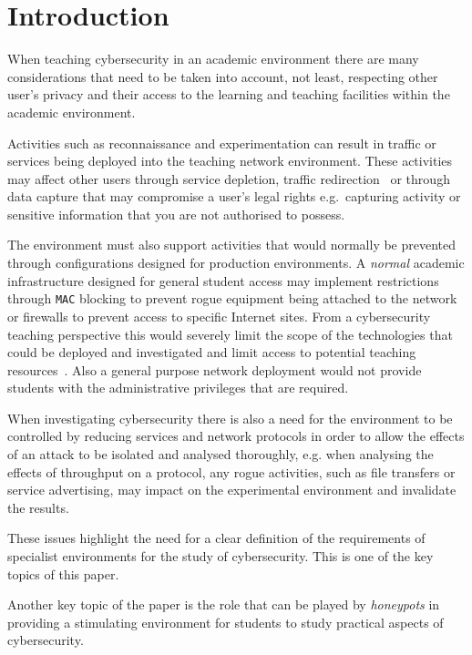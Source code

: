 \documentclass{ieeeaccess}
\begin{document}
\section{Introduction}\label{intro}
When teaching cybersecurity in an academic environment there are many
considerations that need to be taken into account, not least, respecting other
user's privacy and their access to the learning and teaching facilities within
the academic environment.

Activities such as reconnaissance and experimentation can result in traffic or
services being deployed into the teaching network environment. These activities
may affect other users through service depletion, traffic
redirection~\cite{ACGO:06,LR:06} or through data capture that may compromise a
user's legal rights e.g.\ capturing activity or sensitive information that you
are not authorised to possess.

The environment must also support activities that would normally be prevented
through configurations designed for production environments. A \emph{normal}
academic infrastructure designed for general student access may implement
restrictions through \texttt{MAC} blocking to prevent rogue equipment being
attached to the network or firewalls to prevent access to specific Internet
sites. From a cybersecurity teaching perspective this would severely limit the
scope of the technologies that could be deployed and investigated and limit
access to potential teaching resources~\cite{ACGO:06,YYLCHJ:04}. Also a general
purpose network deployment would not provide students with the administrative
privileges that are required.

When investigating cybersecurity there is also a need for the environment to be
controlled by reducing services and network protocols in order to allow the
effects of an attack to be isolated and analysed thoroughly, e.g. when
analysing the effects of throughput on a protocol, any rogue activities, such
as file transfers or service advertising, may impact on the experimental
environment and invalidate the results.

These issues highlight the need for a clear definition of the requirements of
specialist environments for the study of cybersecurity. This is one of the
key topics of this paper.

Another key topic of the paper is the role that can be played by \emph{honeypots}
in providing a stimulating environment for students to study practical
aspects of cybersecurity.
\end{document}
